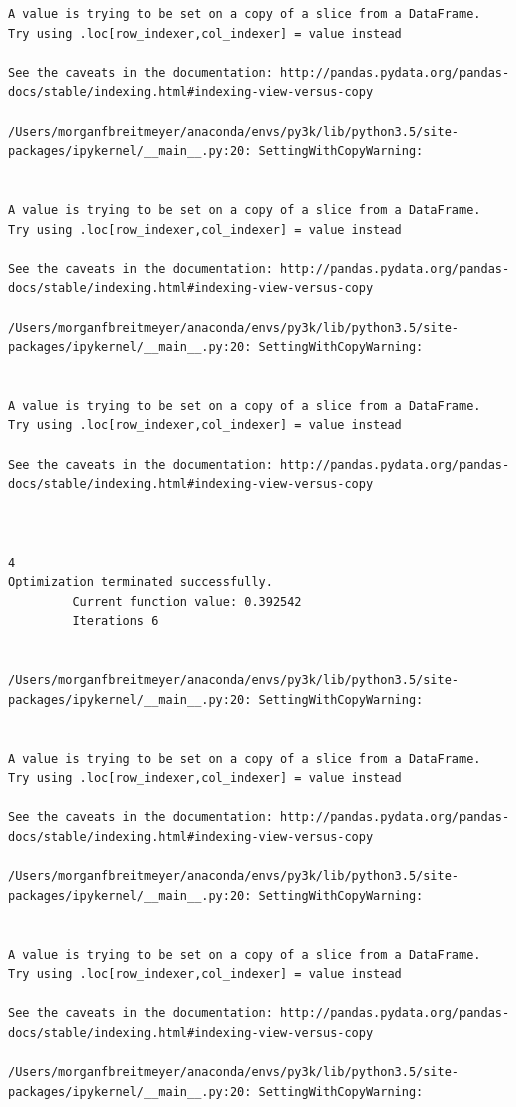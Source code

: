 \begin{lstlisting}
A value is trying to be set on a copy of a slice from a DataFrame.
Try using .loc[row_indexer,col_indexer] = value instead

See the caveats in the documentation: http://pandas.pydata.org/pandas-docs/stable/indexing.html#indexing-view-versus-copy

/Users/morganfbreitmeyer/anaconda/envs/py3k/lib/python3.5/site-packages/ipykernel/__main__.py:20: SettingWithCopyWarning:


A value is trying to be set on a copy of a slice from a DataFrame.
Try using .loc[row_indexer,col_indexer] = value instead

See the caveats in the documentation: http://pandas.pydata.org/pandas-docs/stable/indexing.html#indexing-view-versus-copy

/Users/morganfbreitmeyer/anaconda/envs/py3k/lib/python3.5/site-packages/ipykernel/__main__.py:20: SettingWithCopyWarning:


A value is trying to be set on a copy of a slice from a DataFrame.
Try using .loc[row_indexer,col_indexer] = value instead

See the caveats in the documentation: http://pandas.pydata.org/pandas-docs/stable/indexing.html#indexing-view-versus-copy



4
Optimization terminated successfully.
         Current function value: 0.392542
         Iterations 6


/Users/morganfbreitmeyer/anaconda/envs/py3k/lib/python3.5/site-packages/ipykernel/__main__.py:20: SettingWithCopyWarning:


A value is trying to be set on a copy of a slice from a DataFrame.
Try using .loc[row_indexer,col_indexer] = value instead

See the caveats in the documentation: http://pandas.pydata.org/pandas-docs/stable/indexing.html#indexing-view-versus-copy

/Users/morganfbreitmeyer/anaconda/envs/py3k/lib/python3.5/site-packages/ipykernel/__main__.py:20: SettingWithCopyWarning:


A value is trying to be set on a copy of a slice from a DataFrame.
Try using .loc[row_indexer,col_indexer] = value instead

See the caveats in the documentation: http://pandas.pydata.org/pandas-docs/stable/indexing.html#indexing-view-versus-copy

/Users/morganfbreitmeyer/anaconda/envs/py3k/lib/python3.5/site-packages/ipykernel/__main__.py:20: SettingWithCopyWarning:



\end{lstlisting}
